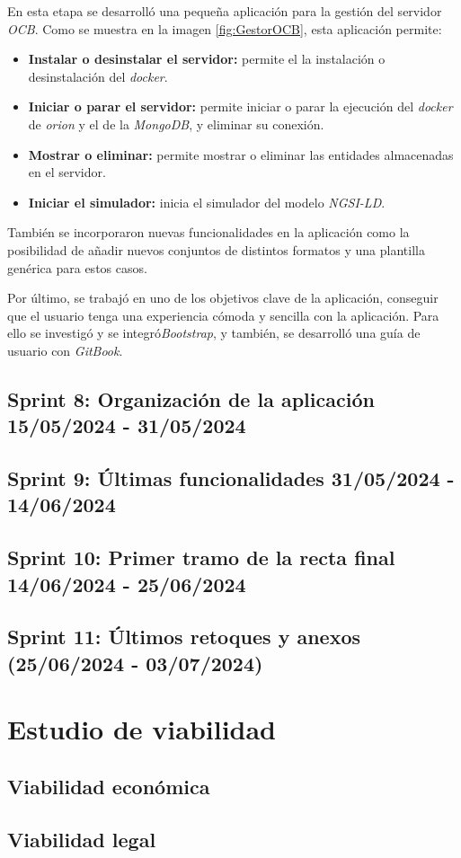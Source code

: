 En esta etapa se desarrolló una pequeña aplicación para la gestión del servidor \textit{OCB}. Como se muestra en la imagen \ref{fig:GestorOCB}, esta aplicación permite:
\begin{itemize}
    \item \textbf{Instalar o desinstalar el servidor:} permite el la instalación o desinstalación del \textit{docker}.
    \item \textbf{Iniciar o parar el servidor:} permite iniciar o parar la ejecución del \textit{docker} de \textit{orion} y el de la \textit{MongoDB}, y eliminar su conexión.
    \item \textbf{Mostrar o eliminar:} permite mostrar o eliminar las entidades almacenadas en el servidor.
    \item \textbf{Iniciar el simulador:} inicia el simulador del modelo \textit{NGSI-LD}.
\end{itemize}


También se incorporaron nuevas funcionalidades en la aplicación como la posibilidad de añadir nuevos conjuntos de distintos formatos y una plantilla genérica para estos casos.

Por último, se trabajó en uno de los objetivos clave de la aplicación, conseguir que el usuario tenga una experiencia cómoda y sencilla con la aplicación. Para ello se investigó y se integró\textit{Bootstrap}, y también, se desarrolló una guía de usuario con \textit{GitBook}.

\subsection{Sprint 8: Organización de la aplicación 15/05/2024 - 31/05/2024}

\subsection{Sprint 9: Últimas funcionalidades 31/05/2024 - 14/06/2024}

\subsection{Sprint 10: Primer tramo de la recta final 14/06/2024 - 25/06/2024}

\subsection{Sprint 11: Últimos retoques y anexos (25/06/2024 - 03/07/2024)}



\section{Estudio de viabilidad}

\subsection{Viabilidad económica}

\subsection{Viabilidad legal}



